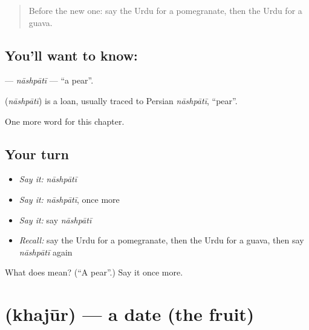 \label{lesson:UR-C116-nashpati}



\begin{quote}
Before the new one: say the Urdu for a pomegranate, then the Urdu for a guava.
\end{quote}

\subsection*{You'll want to know: }
\textbf{} — \emph{nāshpātī} — \textquotedblleft{}a pear\textquotedblright{}.

\begin{cousinweb}
\textbf{} (\emph{nāshpātī}) is a loan, usually traced to Persian \emph{nāshpātī}, \textquotedblleft{}pear\textquotedblright{}.
\end{cousinweb}

\begin{grammarlens}[title={What you've built}]
One more word for this chapter.
\end{grammarlens}

\subsection*{Your turn}
\begin{itemize}
\raggedright
  \item \emph{Say it:} \emph{nāshpātī}
  \item \emph{Say it:} \emph{nāshpātī}, once more
  \item \emph{Say it:} say \emph{nāshpātī}
  \item \emph{Recall:} say the Urdu for a pomegranate, then the Urdu for a guava, then say \emph{nāshpātī} again
\end{itemize}

\begin{tcolorbox}[breakable,colback=teal!4,colframe=teal!35!black,title={Before you move on}]
What does  mean? (\textquotedblleft{}A pear\textquotedblright{}.) Say it once more.
\end{tcolorbox}
\section[\texorpdfstring{\ur{کھجور} (khajūr)}{کھجور (khajūr)}]{ (khajūr) — a date (the fruit)}

\label{lesson:UR-C116-khajur}



